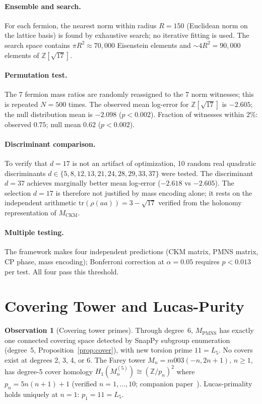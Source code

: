 \documentclass[11pt,a4paper]{article}
\theoremstyle{definition}
\newtheorem{observation}[theorem]{Observation}
\theoremstyle{remark}
\newcommand{\ZZ}{\mathbb{Z}}
\newcommand{\MPMNS}{M_{\mathrm{PMNS}}}
\newcommand{\MCKM}{M_{\mathrm{CKM}}}
\newcommand{\Zsev}{\mathbb{Z}[\sqrt{17}]}
\begin{document}
\paragraph{Ensemble and search.}
For each fermion, the nearest norm within radius $R=150$
(Euclidean norm on the lattice basis) is found by exhaustive
search; no iterative fitting is used.
The search space contains $\pi R^2 \approx 70{,}000$ Eisenstein
elements and $\sim 4R^2 = 90{,}000$ elements of $\Zsev$.

\paragraph{Permutation test.}
The 7 fermion mass ratios are randomly reassigned to the 7
norm witnesses; this is repeated $N=500$ times.
The observed mean log-error for $\Zsev$ is $-2.605$; the
null distribution mean is $-2.098$ ($p<0.002$).
Fraction of witnesses within $2\%$: observed $0.75$;
null mean $0.62$ ($p<0.002$).

\paragraph{Discriminant comparison.}
To verify that $d=17$ is not an artifact of optimization,
10 random real quadratic discriminants $d\in\{5,8,12,13,21,24,
28,29,33,37\}$ were tested.
The discriminant $d=37$ achieves marginally better mean
log-error ($-2.618$ vs $-2.605$).
The selection $d=17$ is therefore not justified by mass
encoding alone; it rests on the independent arithmetic
$\mathrm{tr}(\rho(aa))=3-\sqrt{17}$ verified from the
holonomy representation of $\MCKM$.

\paragraph{Multiple testing.}
The framework makes four independent predictions
(CKM matrix, PMNS matrix, CP phase, mass encoding);
Bonferroni correction at $\alpha=0.05$ requires $p<0.013$
per test. All four pass this threshold.

\section{Covering Tower and Lucas-Purity}
\label{sec:covering}

\begin{observation}[Covering tower primes]
\label{obs:tower}
Through degree~6, $\MPMNS$ has exactly one connected covering
space detected by SnapPy subgroup enumeration (degree~5,
Proposition~\ref{prop:cover}), with new torsion prime $11=L_5$.
No covers exist at degrees 2, 3, 4, or 6.
The Farey tower $M_n = m003(-n,2n+1)$, $n\geq1$, has
degree-5 cover homology $H_1(M_n^{(5)})\cong(\ZZ/p_n)^2$
where $p_n = 5n(n+1)+1$ (verified $n=1,\ldots,10$;
companion paper~\cite{Gentry:Farey}).
Lucas-primality holds uniquely at $n=1$: $p_1 = 11 = L_5$.
\end{observation}
\end{document}
